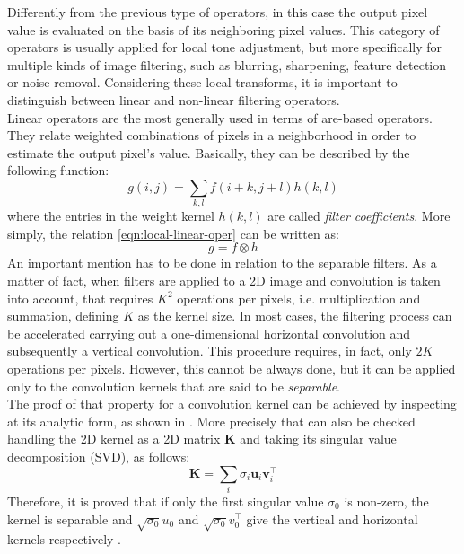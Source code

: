Differently from the previous type of operators, in this case the output pixel value is evaluated on the basis of its neighboring pixel values.
This category of operators is usually applied for local tone adjustment, but more specifically for multiple kinds of image filtering, such as blurring, sharpening, feature detection or noise removal.
Considering these local transforms, it is important to distinguish between linear and non-linear filtering operators.\\
Linear operators are the most generally used in terms of are-based operators. 
They relate weighted combinations of pixels in a neighborhood in order to estimate the output pixel's value. 
Basically, they can be described by the following function:
\begin{equation}
 \label{eqn:local-linear-oper}
 g(i, j) = \sum_{k,l} f(i + k, j + l)h(k, l)
\end{equation}
where the entries in the weight kernel $h(k, l)$ are called \textit{filter coefficients}.
More simply, the relation \ref{eqn:local-linear-oper} can be written as:
\begin{equation}
	\label{eqn:compact-loc-lin-op}
	g = f \otimes h
\end{equation}
An important mention has to be done in relation to the separable filters.
As a matter of fact, when filters are applied to a 2D image and convolution is taken into account, that requires $K^2$ operations per pixels, i.e. multiplication and summation, defining $K$ as the kernel size.
In most cases, the filtering process can be accelerated carrying out a one-dimensional horizontal convolution and subsequently a vertical convolution. 
This procedure requires, in fact, only $2K$ operations per pixels.
However, this cannot be always done, but it can be applied only to the convolution kernels that are said to be \textit{separable}. \\
The proof of that property for a convolution kernel can be achieved by inspecting at its analytic form, as shown in \cite{Freeman1991}.
More precisely that can also be checked handling the 2D kernel as a 2D matrix $\mathbf{K}$ and taking its singular value decomposition (SVD), as follows:
\begin{equation}
	\label{eqn:svd-check-separable}	
	\mathbf{K} = \sum_{i} \sigma_i \mathbf{u}_i \mathbf{v}_i^\top
\end{equation}
Therefore, it is proved that if only the first singular value $\sigma_0$ is non-zero, the kernel is separable and $\sqrt{\sigma_0}u_0$ and $\sqrt{\sigma_0}v_0^\top$ give the vertical and horizontal kernels respectively \cite{Szeliski2011}.
